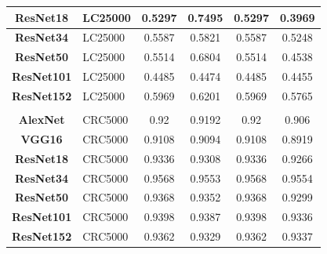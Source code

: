 \begin{table}[t!]
\begin{tabular}{|c|l|c|c|c|c|}
\textbf{ResNet18}      & LC25000                               & 0.5297                & 0.7495                & 0.5297                & 0.3969                \\ \hline
\textbf{ResNet34}      & LC25000                               & 0.5587                & 0.5821                & 0.5587                & 0.5248                \\ \hline
\textbf{ResNet50}      & LC25000                               & 0.5514                & 0.6804                & 0.5514                & 0.4538                \\ \hline
\textbf{ResNet101}     & LC25000                               & 0.4485                & 0.4474                & 0.4485                & 0.4455                \\ \hline
\textbf{ResNet152}     & LC25000                               & 0.5969                & 0.6201                & 0.5969                & 0.5765                \\ \hline
\multicolumn{1}{|l|}{} &                                       & \multicolumn{1}{l|}{} & \multicolumn{1}{l|}{} & \multicolumn{1}{l|}{} & \multicolumn{1}{l|}{} \\ \hline
\textbf{AlexNet}       & CRC5000                               & 0.92                  & 0.9192                & 0.92                  & 0.906                 \\ \hline
\textbf{VGG16}         & CRC5000                               & 0.9108                & 0.9094                & 0.9108                & 0.8919                \\ \hline
\textbf{ResNet18}      & CRC5000                               & 0.9336                & 0.9308                & 0.9336                & 0.9266                \\ \hline
\textbf{ResNet34}      & CRC5000                               & 0.9568                & 0.9553                & 0.9568                & 0.9554                \\ \hline
\textbf{ResNet50}      & CRC5000                               & 0.9368                & 0.9352                & 0.9368                & 0.9299                \\ \hline
\textbf{ResNet101}     & CRC5000                               & 0.9398                & 0.9387                & 0.9398                & 0.9336                \\ \hline
\textbf{ResNet152}     & CRC5000                               & 0.9362                & 0.9329                & 0.9362                & 0.9337                \\ \hline
\end{tabular}
\end{table}



